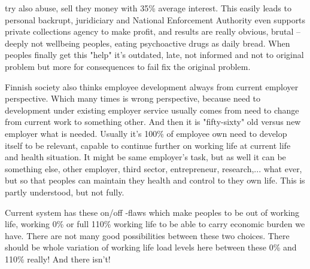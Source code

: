 try also abuse, sell they money with 35\%\allowbreak\cite{
 ConsumerCreditAndMicroloanCompanies} average interest. This easily leads to
personal backrupt, juridiciary\allowbreak\cite{MOT_VelkaantuneidenVastaisku}
and National Enforcement Authority\allowbreak\cite{
 NationalEnforcementAuthorityFinland} even supports private collections agency
to make profit\allowbreak\cite{PaymentDefaultStatistics}, and results are
really obvious, brutal -- deeply not wellbeing peoples, eating psychoactive
drugs\allowbreak\cite{DepressionValidTreatment} as daily
bread\allowbreak\cite{YLE202112131842}\allowbreak\cite{
 YLE202305170931}\allowbreak\cite{YLE202311120715}\allowbreak\cite{
 STM_UglyNumbers20230703}. %
When peoples finally get this "help" it's outdated, late\allowbreak\cite{
 PosCredReg}, not informed and not to original problem but more for
consequences \allowbreak\cite{YLE202112131842}\allowbreak\cite{
 SocialLend}\allowbreak\cite{MOT_VelkaantuneidenVastaisku} to fail fix the
original problem.

Finnish society also thinks employee development always from current employer
perspective. Which many times is wrong perspective, because need to
development under existing employer service usually comes from need to change
from current work to something other. And then it is "fifty-sixty" old versus
new employer what is needed. Usually it's 100\% of employee own need to
develop itself to be relevant, capable to continue further on working life at
current life and health situation\allowbreak\cite{TR_202306151300}. It might
be same employer's task, but as well it can be something else, other employer,
third sector, entrepreneur, research,... what ever, but so that peoples can
maintain they health and control to they own life. This is partly
understood\allowbreak\cite{VN_202303241233}, but not fully\allowbreak\cite{
 AdultEducationAllowance}\allowbreak\cite{VN_2023/58}.

Current system has these on/off -flaws which make peoples to be out of working
life, working 0\% or full 110\% working life to be able to carry economic
burden we have. There are not many good possibilities between these two
choices. There should be whole variation of working life load levels here
between these 0\% and 110\% really! And there isn't!

